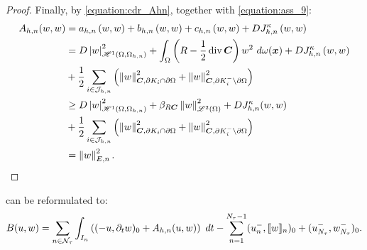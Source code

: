 \begin{proof}
    Finally, by \cref{equation:cdr_Ahn}, together with \cref{equation:ass_9}:
    \begin{align*}
        A_{h, n}(w, w) &= a_{h, n} \left( w, w \right) + b_{h, n} \left( w, w \right) + c_{h, n} \left( w, w \right) + D J^{\kappa}_{h, n} \left( w, w \right) \\
        &= D \left\lvert w \right\rvert_{\mathscr{H}^{1}(\Omega, \Omega_{h, n})}^2 + \int_{\Omega} \left( R - \frac12 \operatorname*{div}{\bm{C}} \right) w^2 ~ d \omega(\bm{x}) + D J^{\kappa}_{h, n} \left( w, w \right) \\
        &+ \frac12 \sum_{i \in \mathcal{J}_{h, n}} \left( \left\lVert  w  \right\rVert_{\bm{C}, \partial K_i \cap \partial \Omega}^2 + \left\lVert  w  \right\rVert_{\bm{C}, \partial K_i^- \setminus \partial \Omega}^2 \right) \\
        &\geq D \left\lvert w \right\rvert_{\mathscr{H}^{1}(\Omega, \Omega_{h, n})}^2 + \beta_{R \bm{C}} \left\lVert w \right\rVert_{\mathscr{L}^{2}(\Omega)}^2 + D J^{\kappa}_{h, n}(w, w) \\
        &+ \frac{1}{2} \sum_{i \in \mathcal{J}_{h, n}} \left( \left\lVert w \right\rVert_{\bm{C}, \partial K_i \cap \partial \Omega}^2 + \left\lVert w \right\rVert_{\bm{C}, \partial K_i^- \setminus \partial \Omega}^2 \right) \\
        &= \left\lVert w \right\rVert_{E, n}^2.
    \end{align*}
\end{proof}

\begin{lemma}[Reformulation of $B$]
     can be reformulated to:
    \begin{align}
        B(u, w) = \sum_{n \in \mathcal{N}_{\tau}} \int_{I_n} \left( (-u, \partial_t w )_0 + A_{h, n}(u, w) \right) ~ dt - \sum_{n = 1}^{N_{\tau} - 1} (u_n^-, \llbracket w \rrbracket_n )_0 + (u_{N_{\tau}}^-, w_{N_{\tau}}^-)_0. \label{equation:cdr_B_reformulated}
    \end{align}
\end{lemma}

